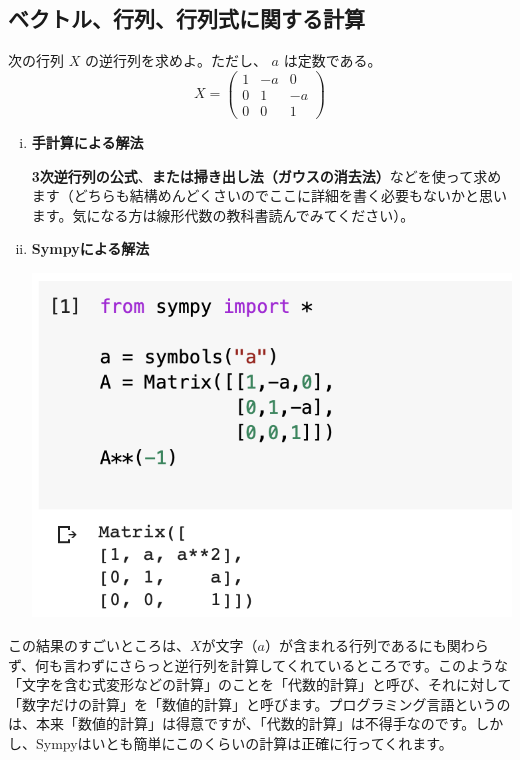 \documentclass[9pt, a5paper,dvipdfmx]{jsbook}
\begin{document}
\subsection{ベクトル、行列、行列式に関する計算}
\begin{framed}
\begin{exq}
次の行列
\large
$X$
\normalsize
の逆行列を求めよ。ただし、
\large
$a$
\normalsize
は定数である。
\Large
$$X=\begin{pmatrix}
1 & -a & 0\\
0 & 1 & -a\\
0 & 0 & 1
\end{pmatrix}$$
\normalsize
\end{exq}
\end{framed}
\begin{enumerate}[(i)]
    \item 
    {\bf 手計算による解法}

{\bf 3次逆行列の公式}、{\bf または掃き出し法（ガウスの消去法）}などを使って求めます（どちらも結構めんどくさいのでここに詳細を書く必要もないかと思います。気になる方は線形代数の教科書読んでみてください）。\\

    \item
    {\bf Sympyによる解法}
    \begin{center}
    \includegraphics[scale=0.5]{fig1-2-6.png}
    \end{center}    
\end{enumerate}
この結果のすごいところは、$X$が文字（$a$）が含まれる行列であるにも関わらず、何も言わずにさらっと逆行列を計算してくれているところです。このような「文字を含む式変形などの計算」のことを「代数的計算」と呼び、それに対して「数字だけの計算」を「数値的計算」と呼びます。プログラミング言語というのは、本来「数値的計算」は得意ですが、「代数的計算」は不得手なのです。しかし、Sympyはいとも簡単にこのくらいの計算は正確に行ってくれます。
\end{document}
